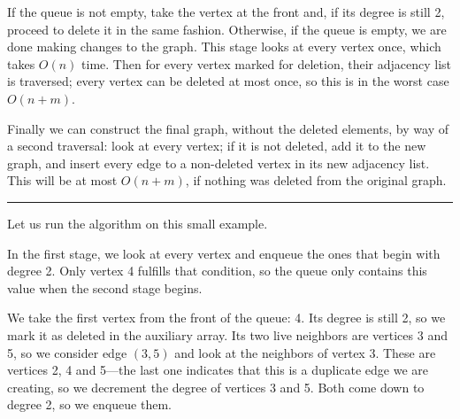 \documentclass{report}
\newcommand{\okthen}{\rule[-1.4pt]{0.3em}{0.77em}}
\begin{document}
If the queue is not empty, take the vertex at the front and, if its degree is still 2, proceed to delete it in the same fashion. Otherwise, if the queue is empty, we are done making changes to the graph. This stage looks at every vertex once, which takes $O(n)$ time. Then for every vertex marked for deletion, their adjacency list is traversed; every vertex can be deleted at most once, so this is in the worst case $O(n+m)$.

Finally we can construct the final graph, without the deleted elements, by way of a second traversal: look at every vertex; if it is not deleted, add it to the new graph, and insert every edge to a non-deleted vertex in its new adjacency list. This will be at most $O(n+m)$, if nothing was deleted from the original graph.\ \okthen

\smallskip

Let us run the algorithm on this small example.
\begin{center}
\end{center}
In the first stage, we look at every vertex and enqueue the ones that begin with degree 2. Only vertex 4 fulfills that condition, so the queue only contains this value when the second stage begins.

We take the first vertex from the front of the queue: 4. Its degree is still 2, so we mark it as deleted in the auxiliary array. Its two live neighbors are vertices 3 and 5, so we consider edge $(3,5)$ and look at the neighbors of vertex 3. These are vertices 2, 4 and 5---the last one indicates that this is a duplicate edge we are creating, so we decrement the degree of vertices 3 and 5. Both come down to degree 2, so we enqueue them.
\begin{center}
\end{center}
\end{document}
